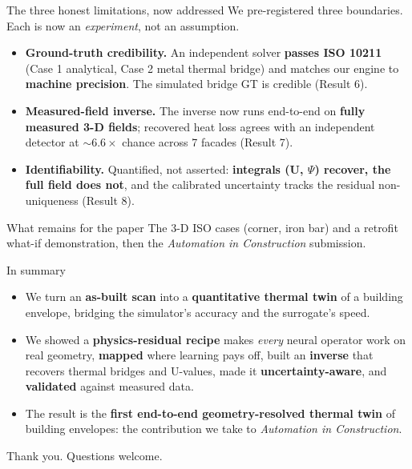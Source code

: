 \documentclass[aspectratio=169]{beamer}
\newcommand{\win}[1]{{\color{green!55!black}\textbf{#1}}}
\begin{document}
\begin{frame}{The three honest limitations, now addressed}
  We pre-registered three boundaries. Each is now an \emph{experiment}, not an assumption.
  \begin{itemize}\small
    \item \textbf{Ground-truth credibility.} An independent solver \win{passes ISO 10211} (Case 1
          analytical, Case 2 metal thermal bridge) and matches our engine to \win{machine precision}.
          The simulated bridge GT is credible (Result 6).
    \item \textbf{Measured-field inverse.} The inverse now runs end-to-end on \win{fully measured 3-D
          fields}; recovered heat loss agrees with an independent detector at $\sim$$6.6\times$ chance
          across 7 facades (Result 7).
    \item \textbf{Identifiability.} Quantified, not asserted: \win{integrals (U, $\Psi$) recover, the
          full field does not}, and the calibrated uncertainty tracks the residual non-uniqueness
          (Result 8).
  \end{itemize}
  \vspace{0.2em}
  \begin{block}{What remains for the paper}
    The 3-D ISO cases (corner, iron bar) and a retrofit what-if demonstration, then the
    \emph{Automation in Construction} submission.
  \end{block}
\end{frame}

\begin{frame}{In summary}
  \begin{itemize}
    \item We turn an \textbf{as-built scan} into a \textbf{quantitative thermal twin} of a building
          envelope, bridging the simulator's accuracy and the surrogate's speed.
    \item We showed a \textbf{physics-residual recipe} makes \emph{every} neural operator work on real
          geometry, \textbf{mapped} where learning pays off, built an \textbf{inverse} that recovers
          thermal bridges and U-values, made it \textbf{uncertainty-aware}, and \textbf{validated}
          against measured data.
    \item The result is the \textbf{first end-to-end geometry-resolved thermal twin} of building
          envelopes: the contribution we take to \emph{Automation in Construction}.
  \end{itemize}
  \vspace{0.5em}
  \centerline{\large Thank you. Questions welcome.}
\end{frame}
\end{document}

